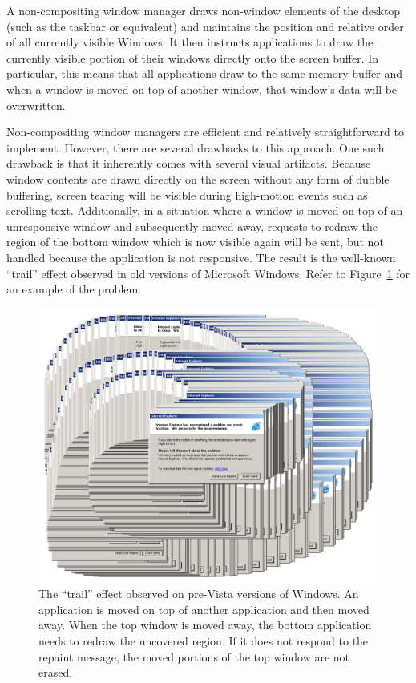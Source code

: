 \documentclass[10pt,twocolumn,a4paper]{article}
\begin{document}
			A non-compositing window manager draws non-window elements of the
			desktop (such as the taskbar or equivalent) and maintains the
			position and relative order of all currently visible Windows. It
			then instructs applications to draw the currently visible portion
			of their windows directly onto the screen buffer. In particular,
			this means that all applications draw to the same memory buffer and
			when a window is moved on top of another window, that window's data
			will be overwritten.

			Non-compositing window managers are efficient and relatively
			straightforward to implement. However, there are several drawbacks
			to this approach.  One such drawback is that it inherently comes
			with several visual artifacts. Because window contents are drawn
			directly on the screen without any form of dubble buffering, screen
			tearing will be visible during high-motion events such as scrolling
			text. Additionally, in a situation where a window is moved on top
			of an unresponsive window and subsequently moved away, requests to
			redraw the region of the bottom window which is now visible again
			will be sent, but not handled because the application is not
			responsive. The result is the well-known \enquote{trail} effect
			observed in old versions of Microsoft Windows. Refer to
			Figure~\ref{fig:trail} for an example of the problem.
			\begin{figure}[h]
				\centering
				\includegraphics[width=0.8\columnwidth]{trail}
				\caption{The \enquote{trail} effect observed on pre-Vista versions
					of Windows. An application is moved on top of another application
					and then moved away. When the top window is moved away, the bottom
					application needs to redraw the uncovered region. If it does not
					respond to the repaint message, the moved portions of the top
					window are not erased.}
				\label{fig:trail}
			\end{figure}
\end{document}
